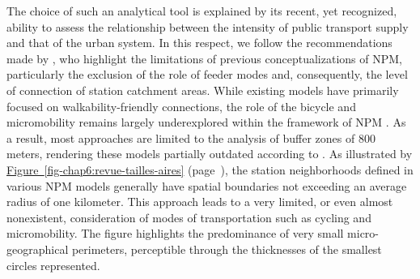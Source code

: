 \begin{refsegment}
The choice of such an analytical tool is explained by its recent, yet recognized, ability to assess the relationship between the intensity of public transport supply and that of the urban system. In this respect, we follow the recommendations made by \textcolor{blue}{\textcite[111]{nigro_land_2019}}, who highlight the limitations of previous conceptualizations of \acrshort{NPM}, particularly the exclusion of the role of feeder modes and, consequently, the level of connection of station catchment areas. While existing models have primarily focused on walkability-friendly connections, the role of the \gls{bicycle} and \gls{micromobility} remains largely underexplored within the framework of \acrshort{NPM} \textcolor{blue}{\autocite[2]{zhang_make_2023}}. As a result, most approaches are limited to the analysis of buffer zones of 800 meters, rendering these models partially outdated according to \textcolor{blue}{\textcite[12]{olaru_place_2019}}. As illustrated by \hyperref[fig-chap6:revue-tailles-aires]{Figure~\ref{fig-chap6:revue-tailles-aires}} (page~\pageref{fig-chap6:revue-tailles-aires}), the station neighborhoods defined in various \acrshort{NPM} models generally have spatial boundaries not exceeding an average radius of one kilometer. This approach leads to a very limited, or even almost nonexistent, consideration of modes of transportation such as cycling and micromobility. The figure highlights the predominance of very small micro-geographical perimeters, perceptible through the thicknesses of the smallest circles represented.%


\end{refsegment}

